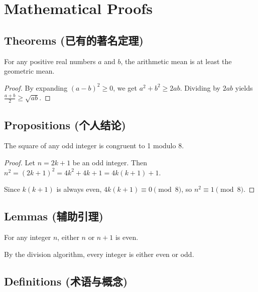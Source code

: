 \documentclass{article}
\begin{document}
\section{Mathematical Proofs}

\subsection{Theorems (已有的著名定理)}

\begin{theorem}
    For any positive real numbers $a$ and $b$, the arithmetic mean is at least the geometric mean.
\end{theorem}

\begin{proof}
    By expanding $(a-b)^2 \geq 0$, we get $a^2 + b^2 \geq 2ab$.
    Dividing by $2ab$ yields $\frac{a+b}{2} \geq \sqrt{ab}$.
\end{proof}

\subsection{Propositions (个人结论)}

\begin{proposition}
    The square of any odd integer is congruent to 1 modulo 8.
\end{proposition}

\begin{proof}
    Let $n = 2k+1$ be an odd integer. Then $n^2 = (2k+1)^2 = 4k^2 + 4k + 1 = 4k(k+1) + 1$.

    Since $k(k+1)$ is always even, $4k(k+1) \equiv 0 \pmod{8}$, so $n^2 \equiv 1 \pmod{8}$.
\end{proof}

\subsection{Lemmas (辅助引理)}

\begin{lemma}
    For any integer $n$, either $n$ or $n+1$ is even.
\end{lemma}

\begin{prooflemma}
    By the division algorithm, every integer is either even or odd.
\end{prooflemma}

\subsection{Definitions (术语与概念)}
\end{document}
